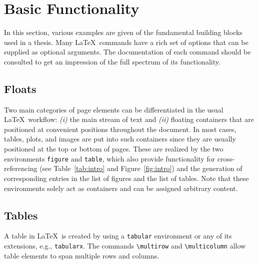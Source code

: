 \section{Basic Functionality}

In this section, various examples are given of the fundamental building blocks used in a thesis.
Many \LaTeX\ commands have a rich set of options that can be supplied as optional arguments.
The documentation of each command should be consulted to get an impression of the full spectrum of its functionality.

\subsection{Floats}

Two main categories of page elements can be differentiated in the usual \LaTeX\ workflow: \textit{(i)} the main stream of text and \textit{(ii)} floating containers that are positioned at convenient positions throughout the document.
In most cases, tables, plots, and images are put into such containers since they are usually positioned at the top or bottom of pages.
These are realized by the two environments \verb|figure| and \verb|table|, which also provide functionality for cross-referencing (see Table~\ref{tab:intro} and Figure~\ref{fig:intro}) and the generation of corresponding entries in the list of figures and the list of tables.
Note that these environments solely act as containers and can be assigned arbitrary content.

\subsection{Tables}

A table in \LaTeX\ is created by using a \verb|tabular| environment or any of its extensions, e.g., \verb|tabularx|.
The commands \verb|\multirow| and \verb|\multicolumn| allow table elements to span multiple rows and columns.

